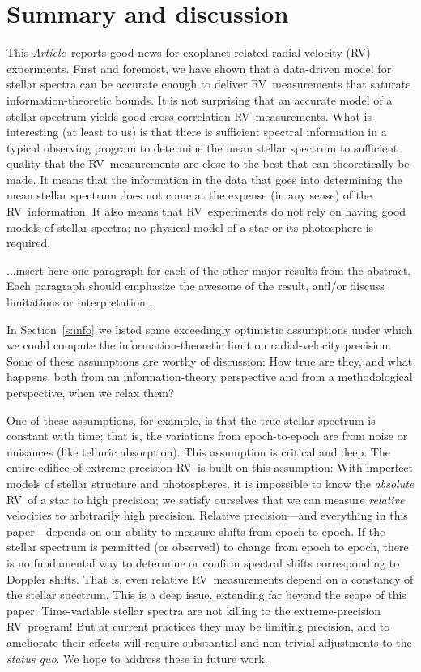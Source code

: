 \documentclass[modern]{aastex631}
\newcommand{\documentname}{\textsl{Article}}
\newcommand{\sectionname}{Section}
\newcommand{\acronym}[1]{{\small{#1}}}
\newcommand{\RV}{\acronym{RV}}
\newcommand{\foreign}[1]{\textsl{#1}}
\begin{document}
\section{Summary and discussion}
\label{s:summary}

This \documentname\ reports good news for exoplanet-related
radial-velocity (\RV) experiments.
First and foremost, we have shown that a data-driven model for
stellar spectra can be accurate enough to deliver
\RV\ measurements that saturate information-theoretic
bounds.
It is not surprising that an accurate model of a stellar spectrum
yields good cross-correlation \RV\ measurements.
What is interesting (at least to us) is that there is sufficient
spectral information in a typical observing
program to determine the mean stellar spectrum to sufficient
quality that the \RV\ measurements are close to the best that can
theoretically be made.
It means that the information in the data that goes into determining
the mean stellar spectrum does not come at the expense (in any sense)
of the \RV\ information.
It also means that \RV\ experiments do not rely on having good models
of stellar spectra; no physical model of a star or its photosphere
is required.

...insert here one paragraph for each of the other major results from
the abstract. Each paragraph should emphasize the awesome of the
result, and/or discuss limitations or interpretation...

In \sectionname~\ref{s:info} we listed some exceedingly
optimistic assumptions under which we could compute the
information-theoretic limit on radial-velocity precision.
Some of these assumptions are worthy of discussion: How true are they,
and what happens, both from an information-theory perspective and from
a methodological perspective, when we relax them?

One of these assumptions, for example, is that the true stellar
spectrum is constant with time; that is, the variations from
epoch-to-epoch are from noise or nuisances (like telluric absorption).
This assumption is critical and deep.
The entire edifice of extreme-precision \RV\ is built on this assumption:
With imperfect models of stellar structure and photospheres, it is
impossible to know the \emph{absolute} \RV\ of a star to high precision;
we satisfy ourselves that we can measure \emph{relative} velocities
to arbitrarily high precision.
Relative precision---and everything in this paper---depends on our
ability to measure shifts from epoch to epoch.
If the stellar spectrum is permitted (or observed) to change from epoch
to epoch, there is no fundamental way to determine or confirm spectral
shifts corresponding to Doppler shifts.
That is, even relative \RV\ measurements depend on a constancy of the
stellar spectrum.
This is a deep issue, extending far beyond the scope of this paper.
Time-variable stellar spectra are not killing to the extreme-precision
\RV\ program!
But at current practices they may be limiting precision,
and to ameliorate their effects will require substantial and non-trivial adjustments to the
\foreign{status quo}.
We hope to address these in future work.
\end{document}
